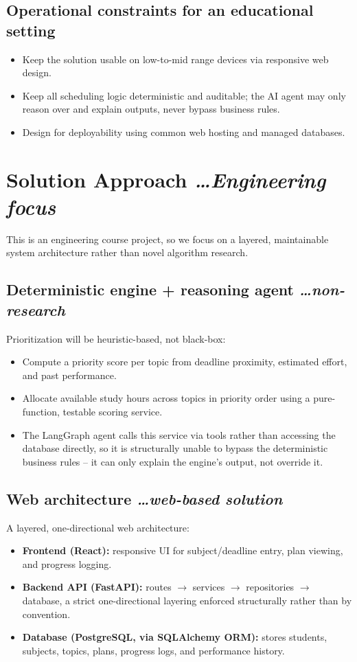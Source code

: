 \documentclass[11pt,a4paper]{article}
\newcommand{\BvrHint}[1]{%
  {\normalfont\normalsize\itshape\hfill #1}}
\begin{document}
\subsection{Operational constraints for an educational setting}
\begin{itemize}[leftmargin=0.7cm]
    \item Keep the solution usable on low-to-mid range devices via responsive web design.
    \item Keep all scheduling logic deterministic and auditable; the AI agent may only reason over and explain outputs, never bypass business rules.
    \item Design for deployability using common web hosting and managed databases.
\end{itemize}

\section{Solution Approach %
\BvrHint{\ldots Engineering focus}}
This is an engineering course project, so we focus on a layered,
maintainable system architecture rather than novel algorithm
research.

\subsection{Deterministic engine + reasoning agent %
\BvrHint{\ldots non-research}}
Prioritization will be heuristic-based, not black-box:
\begin{itemize}[leftmargin=0.7cm]
    \item Compute a priority score per topic from deadline proximity, estimated effort, and past performance.
    \item Allocate available study hours across topics in priority order using a pure-function, testable scoring service.
    \item The LangGraph agent calls this service via tools rather than accessing the database directly, so it is structurally unable to bypass the deterministic business rules -- it can only explain the engine's output, not override it.
\end{itemize}

\subsection{Web architecture %
\BvrHint{\ldots web-based solution}}
A layered, one-directional web architecture:
\begin{itemize}[leftmargin=0.7cm]
    \item \textbf{Frontend (React):} responsive UI for subject/deadline entry, plan viewing, and progress logging.
    \item \textbf{Backend API (FastAPI):} routes $\rightarrow$ services $\rightarrow$ repositories $\rightarrow$ database, a strict one-directional layering enforced structurally rather than by convention.
    \item \textbf{Database (PostgreSQL, via SQLAlchemy ORM):} stores students, subjects, topics, plans, progress logs, and performance history.
\end{itemize}
\end{document}
